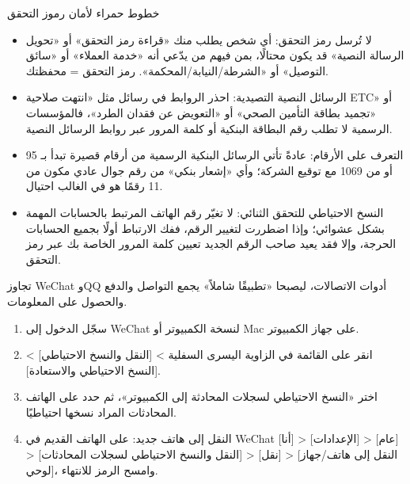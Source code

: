 \begin{tcbwarn}{خطوط حمراء لأمان رموز التحقق}
\begin{itemize}
  \item لا تُرسل رمز التحقق: أي شخص يطلب منك «قراءة رمز التحقق» أو «تحويل الرسالة النصية» قد يكون محتالًا، بمن فيهم من يدّعي أنه «خدمة العملاء» أو «سائق التوصيل» أو «الشرطة/النيابة/المحكمة». رمز التحقق = محفظتك.
  \item الرسائل النصية التصيدية: احذر الروابط في رسائل مثل «انتهت صلاحية ETC» أو «تجميد بطاقة التأمين الصحي» أو «التعويض عن فقدان الطرد»، فالمؤسسات الرسمية لا تطلب رقم البطاقة البنكية أو كلمة المرور عبر روابط الرسائل النصية.
  \item التعرف على الأرقام: عادةً تأتي الرسائل البنكية الرسمية من أرقام قصيرة تبدأ بـ 95 أو من 1069 مع توقيع الشركة؛ وأي «إشعار بنكي» من رقم جوال عادي مكون من 11 رقمًا هو في الغالب احتيال.
  \item النسخ الاحتياطي للتحقق الثنائي: لا تغيّر رقم الهاتف المرتبط بالحسابات المهمة بشكل عشوائي؛ وإذا اضطررت لتغيير الرقم، ففك الارتباط أولًا بجميع الحسابات الحرجة، وإلا فقد يعيد صاحب الرقم الجديد تعيين كلمة المرور الخاصة بك عبر رمز التحقق.
\end{itemize}

\end{tcbwarn}


تجاوز WeChat وQQ أدوات الاتصالات، ليصبحا «تطبيقًا شاملاً» يجمع التواصل والدفع والحصول على المعلومات.


\begin{enumerate}
  \item سجّل الدخول إلى WeChat لنسخة الكمبيوتر أو Mac على جهاز الكمبيوتر.
  \item انقر على القائمة في الزاوية اليسرى السفلية > [النقل والنسخ الاحتياطي] > [النسخ الاحتياطي والاستعادة].
  \item اختر «النسخ الاحتياطي لسجلات المحادثة إلى الكمبيوتر»، ثم حدد على الهاتف المحادثات المراد نسخها احتياطيًا.
  \item النقل إلى هاتف جديد: على الهاتف القديم في WeChat [أنا] > [الإعدادات] > [عام] > [النقل والنسخ الاحتياطي لسجلات المحادثات] > [نقل] > [النقل إلى هاتف/جهاز لوحي]، وامسح الرمز للانتهاء.
\end{enumerate}


